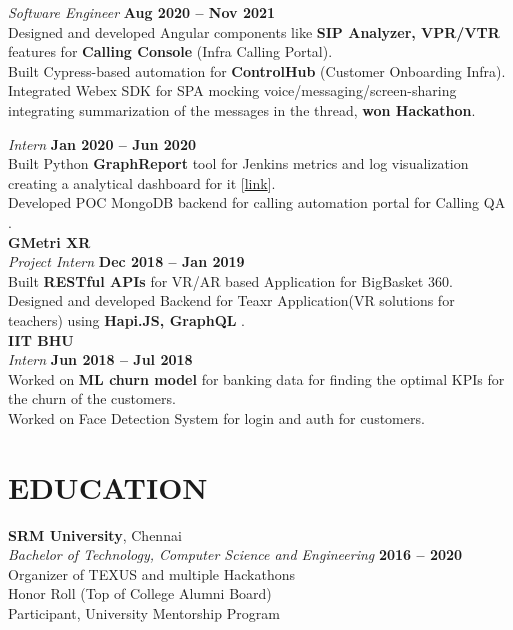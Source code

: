 \documentclass[margin,line]{resume}
\begin{document}
\begin{resume}
\vspace{1mm}

\textsl{Software Engineer} \hfill \textbf{Aug 2020 -- Nov 2021}\\
Designed and developed Angular components like \textbf{SIP Analyzer, VPR/VTR} features for \textbf{Calling Console} (Infra Calling Portal).\\
Built Cypress-based automation for \textbf{ControlHub} (Customer Onboarding Infra).\\
Integrated Webex SDK for SPA mocking voice/messaging/screen-sharing integrating summarization of the messages in the thread,\textbf{ won Hackathon}.\\

\vspace{1mm}

\textsl{Intern} \hfill \textbf{Jan 2020 -- Jun 2020}\\
Built Python \textbf{GraphReport }tool for Jenkins metrics and log visualization creating a analytical dashboard for it [\href{https://pypi.org/project/graphreport/}{link}].\\
Developed POC MongoDB backend for calling automation portal for Calling QA .\\

\textbf{\listing GMetri XR} \vspace{2mm}\\
\textsl{Project Intern} \hfill \textbf{Dec 2018 -- Jan 2019}\\
Built \textbf{RESTful APIs} for VR/AR based Application for BigBasket 360.\\
Designed and developed Backend for Teaxr Application(VR solutions for teachers) using \textbf{Hapi.JS, GraphQL} .\\

\textbf{\listing IIT BHU} \vspace{2mm}\\
\textsl{Intern} \hfill \textbf{Jun 2018 -- Jul 2018}\\
Worked on \textbf{ML churn model} for banking data for finding the optimal KPIs for the churn of the customers.\\
Worked on Face Detection System for login and auth for customers.\\

\newpage 
\section{\mysidestyle \textbf{\large{E}\small{DUCATION}}}
\textbf{\listing SRM University}, Chennai \vspace{1mm}\\
\textsl{Bachelor of Technology, Computer Science and Engineering} \hfill \textbf{2016 -- 2020}\\
Organizer of TEXUS and multiple Hackathons\\
Honor Roll (Top of College Alumni Board)\\
Participant, University Mentorship Program\\



\end{resume}
\end{document}

